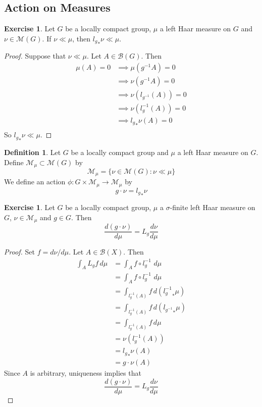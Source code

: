 \documentclass[12pt]{amsart}
\theoremstyle{definition}
\newtheorem{defn}[definition]{Definition}
\newtheorem{ex}[definition]{Exercise}
\newcommand{\sig}{\sigma}
\newcommand{\MB}{\mathcal{B}}
\newcommand{\MM}{\mathcal{M}}
\newcommand{\dmu}{\, d \mu}
\begin{document}
	\subsection{Action on Measures}
	\begin{ex}
	Let $G$ be a locally compact group, $\mu$ a left Haar measure on $G$ and $\nu \in \MM(G)$. If $\nu \ll \mu$, then ${l_g}_*\nu \ll \mu$.
	\end{ex}
	
	\begin{proof}
	Suppose that $\nu \ll \mu$. Let $A \in \MB(G)$. Then
	\begin{align*}
	\mu(A) = 0 
	&\implies \mu(g^{-1}A) = 0 \\
	&\implies \nu(g^{-1}A) = 0 \\
	&\implies \nu(l_{g^{-1}}(A)) = 0 \\
	&\implies \nu(l_{g}^{-1}(A)) = 0 \\
	&\implies {l_g}_*\nu(A) = 0 \\
	\end{align*}
	So ${l_g}_*\nu \ll \mu$.
	\end{proof}

	\begin{defn}
	Let $G$ be a locally compact group and $\mu$ a left Haar measure on $G$. Define $\MM_{\mu} \subset \MM(G)$ by $$\MM_{\mu} = \{\nu \in \MM(G):\nu \ll \mu\}$$
	We define an action $\phi:G \times \MM_{\mu} \rightarrow \MM_{\mu}$ by $$g \cdot \nu = {l_g}_*\nu$$ 
	\end{defn}	
	
	\begin{ex}
	Let $G$ be a locally compact group, $\mu$ a $\sig$-finite left Haar measure on $G$, $\nu \in \MM_{\mu}$ and $g \in G$. Then $$ \frac{d (g \cdot \nu)}{d\mu} =  L_g \frac{d \nu}{d\mu}$$
	\end{ex}
	
	\begin{proof}
	Set $f = d \nu/ d \mu$. Let $A \in \MB(X)$. Then 
	\begin{align*}
	\int_A L_g f \dmu
	&= \int_A f \circ l_{g}^{-1} \,\dmu \\
	&= \int_A f \circ l_g^{-1} \, \dmu \\
	&= \int_{l_g^{-1}(A)} f \, d ({l_g^{-1}}_* \mu) \\
	&= \int_{l_g^{-1}(A)} f \, d ({l_{g^{-1}}}_* \mu) \\
	&= \int_{l_g^{-1}(A)} f \, d \mu \\
	&= \nu(l_g^{-1}(A)) \\
	&= {l_g}_*\nu(A) \\
	&= g \cdot \nu(A)
	\end{align*}
	Since $A$ is arbitrary, uniqueness implies that 
	$$ \frac{d (g \cdot \nu)}{d\mu} =  L_g \frac{d \nu}{d\mu}$$
	\end{proof}
	
\end{document}

